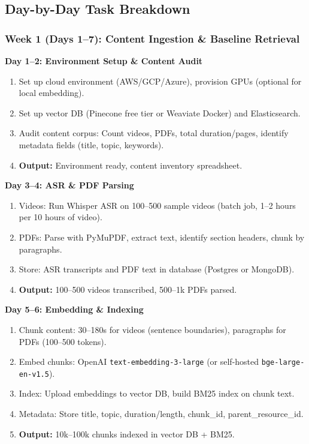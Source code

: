 \documentclass[11pt,letterpaper]{article}
\begin{document}
\subsection{Day-by-Day Task Breakdown}\label{subsec:day-by-day-tasks}

\subsubsection{Week 1 (Days 1--7): Content Ingestion \& Baseline Retrieval}

\textbf{Day 1--2: Environment Setup \& Content Audit}
\begin{enumerate}
\item Set up cloud environment (AWS/GCP/Azure), provision GPUs (optional for local embedding).
\item Set up vector DB (Pinecone free tier or Weaviate Docker) and Elasticsearch.
\item Audit content corpus: Count videos, PDFs, total duration/pages, identify metadata fields (title, topic, keywords).
\item \textbf{Output:} Environment ready, content inventory spreadsheet.
\end{enumerate}

\textbf{Day 3--4: ASR \& PDF Parsing}
\begin{enumerate}
\item Videos: Run Whisper ASR on 100--500 sample videos (batch job, 1--2 hours per 10 hours of video).
\item PDFs: Parse with PyMuPDF, extract text, identify section headers, chunk by paragraphs.
\item Store: ASR transcripts and PDF text in database (Postgres or MongoDB).
\item \textbf{Output:} 100--500 videos transcribed, 500--1k PDFs parsed.
\end{enumerate}

\textbf{Day 5--6: Embedding \& Indexing}
\begin{enumerate}
\item Chunk content: 30--180s for videos (sentence boundaries), paragraphs for PDFs (100--500 tokens).
\item Embed chunks: OpenAI \texttt{text-embedding-3-large} (or self-hosted \texttt{bge-large-en-v1.5}).
\item Index: Upload embeddings to vector DB, build BM25 index on chunk text.
\item Metadata: Store title, topic, duration/length, chunk\_id, parent\_resource\_id.
\item \textbf{Output:} 10k--100k chunks indexed in vector DB + BM25.
\end{enumerate}
\end{document}
